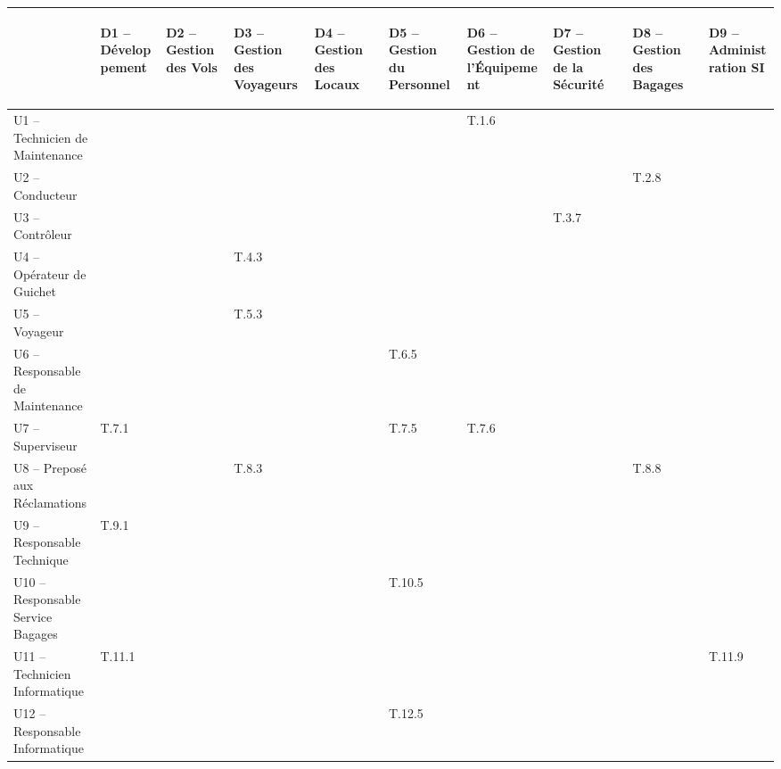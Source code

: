 \providecommand{\DJSPU}[1]{}

\vspace{-2cm}
\begin{turn}{-90}
\begin {tabular} {| l | l | l | l | l | l | l | l | l | l | }
\hline
~
&\begin{sideways}D1 -- Développement\end{sideways}
&\begin{sideways}D2 -- Gestion des Vols\end{sideways}
&\begin{sideways}D3 -- Gestion des Voyageurs\end{sideways}
&\begin{sideways}D4 -- Gestion des Locaux\end{sideways}
&\begin{sideways}D5 -- Gestion du Personnel\end{sideways}
&\begin{sideways}D6 -- Gestion de l'Équipement\end{sideways}
&\begin{sideways}D7 -- Gestion de la Sécurité\end{sideways}
&\begin{sideways}D8 -- Gestion des Bagages\end{sideways}
&\begin{sideways}D9 -- Administration SI\end{sideways}\\
\hline
U1 --  Technicien de Maintenance  & & & & & &T.1.6 & & &  \\
\hline
U2 --  Conducteur  & & & & & & & &T.2.8 &  \\
\hline
U3 --  Contrôleur  & & & & & & &T.3.7 & &  \\
\hline
U4 --  Opérateur de Guichet  & & &T.4.3 & & & & & &  \\
\hline
U5 --  Voyageur  & & &T.5.3 & & & & & &  \\
\hline
U6 --  Responsable de Maintenance  & & & & &T.6.5 & & &  &\\
\hline
U7 --  Superviseur  &\DJSPU1 T.7.1 & & & & T.7.5 &T.7.6 & & &\\
\hline
U8 --  Preposé aux Réclamations  & & &T.8.3 & & & & &T.8.8 &\\
\hline
U9 --  Responsable Technique  &\DJSPU1 T.9.1 & & & & & & & &\\
\hline
U10 --  Responsable Service Bagages & & & & &T.10.5 & & & &  \\
\hline
U11 --  Technicien Informatique  &T.11.1 & & & & & & & &T.11.9  \\
\hline
U12 --  Responsable Informatique  & & & & &T.12.5 & & & &  \\
\hline
\end {tabular}
\end{turn}

